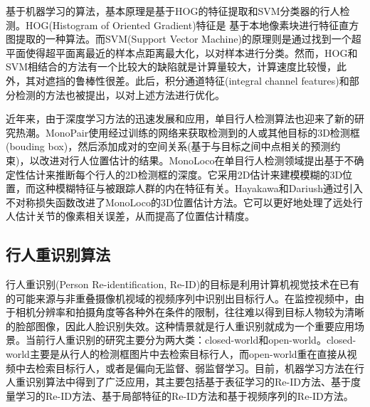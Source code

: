 基于机器学习的算法，基本原理是基于HOG的特征提取和SVM分类器的行人检测。HOG(Histogram of Oriented Gradient)\cite{histograms}特征是
基于本地像素块进行特征直方图提取的一种算法。而SVM(Support Vector Machine)的原理则是通过找到一个超平面使得超平面离最近的样本点距离最大化，以对样本进行分类。然而，HOG和SVM相结合的方法有一个比较大的缺陷就是计算量较大，计算速度比较慢，此外，其对遮挡的鲁棒性很差。此后，积分通道特征(integral channel features)\cite{dollar2009integral}和部分检测的方法也被提出，以对上述方法进行优化。

近年来，由于深度学习方法的迅速发展和应用，单目行人检测算法也迎来了新的研究热潮。MonoPair\cite{monopair}使用经过训练的网络来获取检测到的人或其他目标的3D检测框(bouding box)，然后添加成对的空间关系(基于与目标之间中点相关的预测约束)，以改进对行人位置估计的结果。MonoLoco\cite{monoloco}在单目行人检测领域提出基于不确定性估计来推断每个行人的2D检测框的深度。它采用2D估计来建模模糊的3D位置，而这种模糊特征与被跟踪人群的内在特征有关。Hayakawa和Dariush\cite{hayakawa}通过引入不对称损失函数改进了MonoLoco的3D位置估计方法。它可以更好地处理了远处行人估计关节的像素相关误差，从而提高了位置估计精度。

\subsection{行人重识别算法}

行人重识别(Person Re-identification, Re-ID)的目标是利用计算机视觉技术在已有的可能来源与非重叠摄像机视域的视频序列中识别出目标行人。在监控视频中，由于相机分辨率和拍摄角度等各种外在条件的限制，往往难以得到目标人物较为清晰的脸部图像，因此人脸识别失效。这种情景就是行人重识别就成为一个重要应用场景。当前行人重识别的研究主要分为两大类：closed-world和open-world。closed-world主要是从行人的检测框图片中去检索目标行人，而open-world重在直接从视频中去检索目标行人，或者是偏向无监督、弱监督学习。目前，机器学习方法在行人重识别算法中得到了广泛应用，其主要包括基于表征学习的Re-ID方法、基于度量学习的Re-ID方法、基于局部特征的Re-ID方法和基于视频序列的Re-ID方法。

